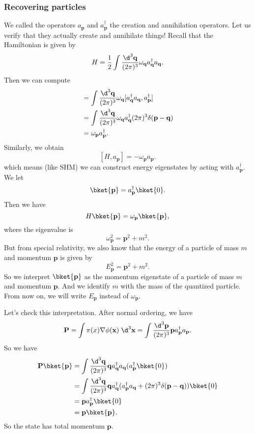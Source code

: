 \documentclass[a4paper]{article}
\begin{document}
\subsubsection*{Recovering particles}
We called the operators $a_\mathbf{p}$ and $a_\mathbf{p}^\dagger$ the creation and annihilation operators. Let us verify that they actually create and annihilate things! Recall that the Hamiltonian is given by
\[
  H = \frac{1}{2} \int \frac{\d^3 \mathbf{q}}{(2\pi)^3} \omega_\mathbf{q} a_\mathbf{q}^\dagger a_\mathbf{q}.
\]
Then we can compute
\begin{align*}
  [H, a_\mathbf{p}^\dagger] &= \int \frac{\d^3 \mathbf{q}}{(2\pi)^3} \omega_\mathbf{q} [a_\mathbf{q}^\dagger a_\mathbf{q}, a_\mathbf{p}^\dagger]\\
  &= \int \frac{\d^3 \mathbf{q}}{(2\pi)^3} \omega_\mathbf{q} a_\mathbf{q}^\dagger (2\pi)^3 \delta(\mathbf{p} - \mathbf{q})\\
  &= \omega_\mathbf{p} a_\mathbf{p}^\dagger.
\end{align*}
Similarly, we obtain
\[
  [H, a_\mathbf{p}] = - \omega_\mathbf{p} a_\mathbf{p}.
\]
which means (like SHM) we can construct energy eigenstates by acting with $a_\mathbf{p}^\dagger$. We let
\[
  \bket{\mathbf{p}} = a_\mathbf{p}^\dagger \bket{0}.
\]
Then we have
\[
  H\bket{\mathbf{p}} = \omega_\mathbf{p} \bket{\mathbf{p}},
\]
where the eigenvalue is
\[
  \omega_\mathbf{p}^2 = \mathbf{p}^2 + m^2.
\]
But from special relativity, we also know that the energy of a particle of mass $m$ and momentum $\mathbf{p}$ is given by
\[
  E_\mathbf{p}^2 = \mathbf{p}^2 + m^2.
\]
So we interpret $\bket{\mathbf{p}}$ as the momentum eigenstate of a particle of mass $m$ and momentum $\mathbf{p}$. And we identify $m$ with the mass of the quantized particle. From now on, we will write $E_\mathbf{p}$ instead of $\omega_\mathbf{p}$.

Let's check this interpretation. After normal ordering, we have
\[
  \mathbf{P} = \int \pi(x) \nabla \phi(\mathbf{x}) \;\d^3 \mathbf{x} = \int \frac{\d^3 \mathbf{p}}{(2\pi)^3} \mathbf{p} a_\mathbf{p}^\dagger a_\mathbf{p}.
\]
So we have
\begin{align*}
  \mathbf{P}\bket{\mathbf{p}} &= \int \frac{\d^3 \mathbf{q}}{(2\pi)^3} \mathbf{q} a_\mathbf{q}^\dagger a_\mathbf{q}(a_\mathbf{p}^\dagger \bket{0})\\
  &= \int \frac{\d^3 \mathbf{q}}{(2\pi)^3} \mathbf{q} a_\mathbf{q}^\dagger (a_\mathbf{p}^\dagger a_\mathbf{q} + (2\pi)^3 \delta(\mathbf{p} - \mathbf{q}))\bket{0}\\
  &= \mathbf{p}a_\mathbf{p}^\dagger \bket{0}\\
  &= \mathbf{p}\bket{\mathbf{p}}.
\end{align*}
So the state has total momentum $\mathbf{p}$.
\end{document}

